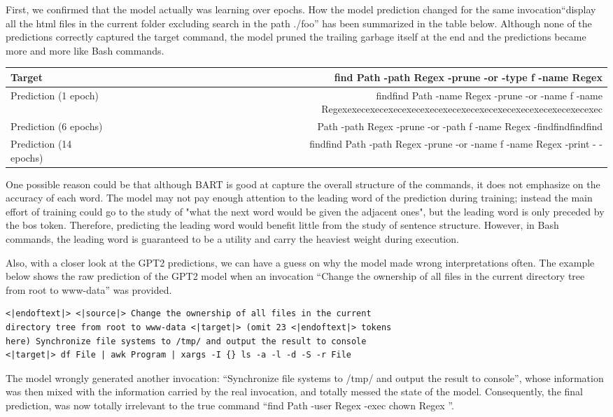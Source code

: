 First, we confirmed that the model actually was learning over epochs. How the model prediction changed for the same invocation``display all the html files in the current folder excluding search in the path ./foo'' has been summarized in the table below. Although none of the predictions correctly captured the target command, the model pruned the trailing garbage itself at the end and the predictions became more and more like Bash commands.

\begin{center}
\begin{tabular}{|M|N|}
    \hline
     Target&  find Path -path Regex -prune -or -type f -name Regex\\
     \hline
     Prediction (1 epoch)&  findfind Path -name Regex -prune -or -name f -name Regexexecexecexecexecexecexecexecexecexecexecexecexecexecexec\\
     \hline
     Prediction (6 epochs)&  Path -path Regex -prune -or -path f -name Regex -findfindfindfind\\
     \hline
     Prediction (14 epochs)& findfind Path -path Regex -prune -or -name f -name Regex -print - -\\
     \hline
\end{tabular}
\end{center}

One possible reason could be that although BART is good at capture the overall structure of the commands, it does not emphasize on the accuracy of each word. The model may not pay enough attention to the leading word of the prediction during training; instead the main effort of training could go to the study of "what the next word would be given the adjacent ones", but the leading word is only preceded by the bos token. Therefore, predicting the leading word would benefit little from the study of sentence structure. However, in Bash commands, the leading word is guaranteed to be a utility and carry the heaviest weight during execution.

Also, with a closer look at the GPT2 predictions, we can have a guess on why the model made wrong interpretations often.  The example below shows the raw prediction of the GPT2 model when an invocation ``Change the ownership of all files in the current directory tree from root to www-data'' was provided.

\begin{verbatim}
<|endoftext|> <|source|> Change the ownership of all files in the current 
directory tree from root to www-data <|target|> (omit 23 <|endoftext|> tokens 
here) Synchronize file systems to /tmp/ and output the result to console 
<|target|> df File | awk Program | xargs -I {} ls -a -l -d -S -r File
\end{verbatim}
The model wrongly generated another invocation: ``Synchronize file systems to /tmp/ and output the result to console'', whose information was then mixed with the information carried by the real invocation, and totally messed the state of the model. Consequently, the final prediction, was now totally irrelevant to the true command ``find Path -user Regex -exec chown Regex {}''.

